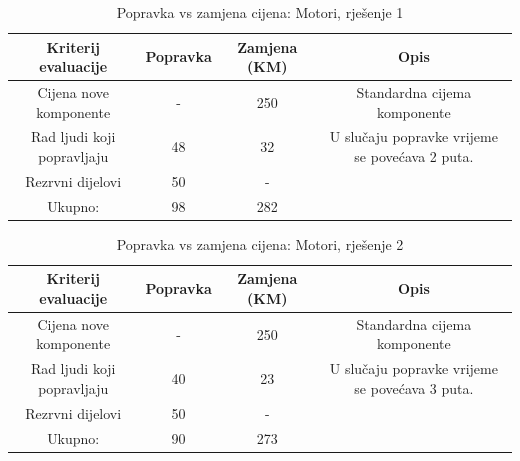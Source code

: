 \documentclass[12pt]{article}
\begin{document}
\begin{landscape}
\vspace*{\fill}
\begin{table}[htbp]
  \centering
\footnotesize
  \caption{Popravka vs zamjena cijena: Motori, rješenje 1}
    \begin{tabular}{cccc}
    \toprule
    Kriterij evaluacije & Popravka & Zamjena (KM) & Opis \\
    \midrule
     Cijena nove komponente & -     & 250   & \multicolumn{1}{p{19.57em}}{Standardna \newline{}cijema\newline{} komponente} \\
    \midrule
    Rad ljudi koji popravljaju & 48    & 32    & \multicolumn{1}{p{19.57em}}{ U slučaju popravke vrijeme se povećava 2 puta. } \\
    \midrule
    Rezrvni dijelovi & 50    & -     &  \\
    \midrule
    Ukupno: & 98    & 282   &  \\
    \bottomrule
    \end{tabular}%
  \label{tab:addlabel}%
\end{table}%

\begin{table}[htbp]
\footnotesize
  \centering
  \caption{Popravka vs zamjena cijena: Motori, rješenje 2 }
    \begin{tabular}{cccc}
    \toprule
    Kriterij evaluacije & Popravka & Zamjena (KM) & Opis \\
    \midrule
     Cijena nove komponente & -     & 250   & \multicolumn{1}{p{23.215em}}{Standardna \newline{}cijema\newline{} komponente} \\
    \midrule
    Rad ljudi koji popravljaju & 40    & 23    & \multicolumn{1}{p{23.215em}}{ U slučaju popravke vrijeme se povećava 3 puta. } \\
    \midrule
    Rezrvni dijelovi & 50    & -     &  \\
    \midrule
    Ukupno: & 90    & 273   &  \\
    \bottomrule
    \end{tabular}%
  \label{tab:addlabel}%
\end{table}%
\vspace*{\fill}
\end{landscape}
\end{document}
